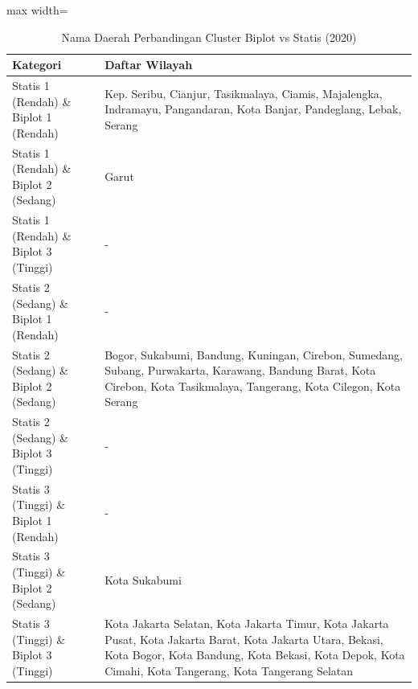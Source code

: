 \begin{table}[H]
\centering
\caption{Nama Daerah Perbandingan Cluster Biplot vs Statis (2020)} \label{tab:appbiplot_statis_name_2020}
\begin{adjustbox}{max width=\textwidth}
\begin{tabular}{|p{4cm}|p{10cm}|}
\hline
\textbf{Kategori} & \textbf{Daftar Wilayah} \\
\hline
Statis 1 (Rendah) \& Biplot 1 (Rendah) & Kep. Seribu, Cianjur, Tasikmalaya, Ciamis, Majalengka, Indramayu, Pangandaran, Kota Banjar, Pandeglang, Lebak, Serang \\
\hline
Statis 1 (Rendah) \& Biplot 2 (Sedang) & Garut \\
\hline
Statis 1 (Rendah) \& Biplot 3 (Tinggi) & - \\
\hline
Statis 2 (Sedang) \& Biplot 1 (Rendah) & - \\
\hline
Statis 2 (Sedang) \& Biplot 2 (Sedang) & Bogor, Sukabumi, Bandung, Kuningan, Cirebon, Sumedang, Subang, Purwakarta, Karawang, Bandung Barat, Kota Cirebon, Kota Tasikmalaya, Tangerang, Kota Cilegon, Kota Serang \\
\hline
Statis 2 (Sedang) \& Biplot 3 (Tinggi) & - \\
\hline
Statis 3 (Tinggi) \& Biplot 1 (Rendah) & - \\
\hline
Statis 3 (Tinggi) \& Biplot 2 (Sedang) & Kota Sukabumi \\
\hline
Statis 3 (Tinggi) \& Biplot 3 (Tinggi) & Kota Jakarta Selatan, Kota Jakarta Timur, Kota Jakarta Pusat, Kota Jakarta Barat, Kota Jakarta Utara, Bekasi, Kota Bogor, Kota Bandung, Kota Bekasi, Kota Depok, Kota Cimahi, Kota Tangerang, Kota Tangerang Selatan \\
\hline
\end{tabular}
\end{adjustbox}
\end{table}